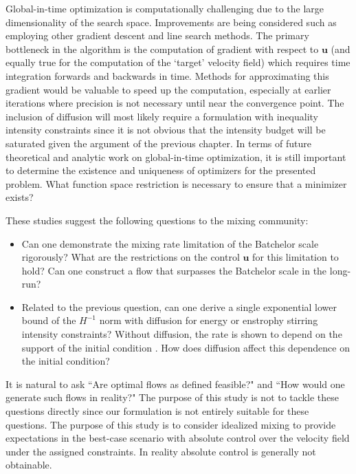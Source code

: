Global-in-time optimization is computationally challenging due to the large dimensionality of the search space. Improvements are being considered such as employing other gradient descent and line search methods. The primary bottleneck in the algorithm is the computation of gradient with respect to $\mathbf{u}$ (and equally true for the computation of the `target' velocity field) which requires time integration forwards and backwards in time. Methods for approximating this gradient would be valuable to speed up the computation, especially at earlier iterations where precision is not necessary until near the convergence point. The inclusion of diffusion will most likely require a formulation with inequality intensity constraints since it is not obvious that the intensity budget will be saturated given the argument of the previous chapter. In terms of future  theoretical and analytic work on global-in-time optimization, it is still important to determine the existence and uniqueness of optimizers for the presented problem. What function space restriction is necessary to ensure that a minimizer exists? 

These studies suggest the following questions to the mixing community:
\begin{itemize}
\item Can one demonstrate the mixing rate limitation of the Batchelor scale rigorously? What are the restrictions on the control $\mathbf{u}$ for this limitation to hold? Can one construct a flow that surpasses the Batchelor scale in the long-run?

\item Related to the previous question, can one derive a single exponential lower bound of the $H^{-1}$ norm with diffusion for energy or enstrophy stirring intensity constraints? Without diffusion, the rate is shown to depend on the support of the initial condition \cite{GI2014}. How does diffusion affect this dependence on the initial condition?
\end{itemize}


It is natural to ask ``Are optimal flows as defined feasible?" and ``How would one generate such flows in reality?" The purpose of this study is not to tackle these questions directly since our formulation is not entirely suitable for these questions. The purpose of this study is to consider idealized mixing to provide expectations in the best-case scenario with absolute control over the velocity field under the assigned constraints. In reality absolute control is generally not obtainable. 


